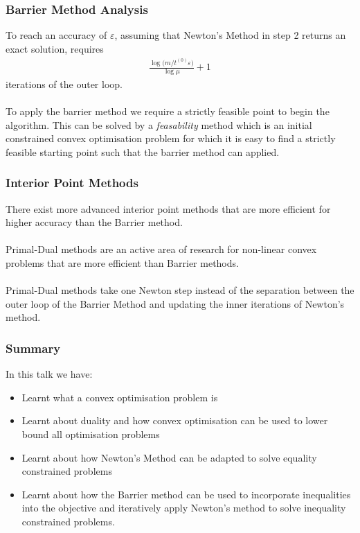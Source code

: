 \documentclass{beamer}
\begin{document}
\begin{frame}
    \frametitle{Barrier Method Analysis}
    To reach an accuracy of $\varepsilon$, assuming that Newton's Method in step
    2 returns an exact solution, requires
    \begin{align*}
        \frac{\log(m/{t^{(0)}\varepsilon)}}{\log \mu}+1
    \end{align*}
    iterations of the outer loop.
    \\~\\
    To apply the barrier method we require a strictly feasible point to begin
    the algorithm. This can be solved by a \textit{feasability} method which is
    an initial constrained convex optimisation problem for which it is easy to find a strictly
    feasible starting point such that the barrier method can applied.
\end{frame}


\begin{frame}
    \frametitle{Interior Point Methods}
    There exist more advanced interior point methods that are more efficient
    for higher accuracy than the Barrier method.
    \\~\\
    Primal-Dual methods are an active area of research for non-linear convex
    problems that are more efficient than Barrier methods.
    \\~\\
    Primal-Dual methods take one Newton step instead of the separation between
    the outer loop of the Barrier Method and updating the inner iterations of
    Newton's method.
\end{frame}

\begin{frame}
    \frametitle{Summary}
    In this talk we have:
    \begin{itemize}
        \item Learnt what a convex optimisation problem is
        \item Learnt about duality and how convex optimisation can be used to lower bound all
            optimisation problems
        \item Learnt about how Newton's Method can be adapted to solve equality
            constrained problems
        \item Learnt about how the Barrier method can be used to incorporate
            inequalities into the objective and iteratively apply Newton's
            method to solve inequality constrained problems.
    \end{itemize}
\end{frame}
\end{document}

